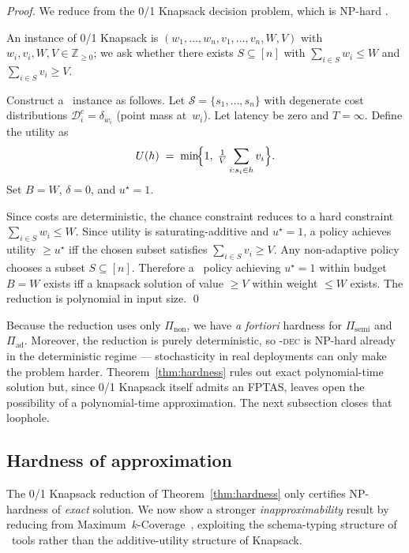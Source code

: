 \begin{proof}
We reduce from the 0/1 Knapsack decision problem, which is NP-hard
\cite{garey1979computers}.

An instance of 0/1 Knapsack is
$(w_1, \dots, w_n, v_1, \dots, v_n, W, V)$ with
$w_i, v_i, W, V \in \mathbb{Z}_{\ge 0}$; we ask whether there exists
$S \subseteq [n]$ with
$\sum_{i \in S} w_i \le W$ and $\sum_{i \in S} v_i \ge V$.

Construct a \CBSLAO~instance as follows. Let
$\mathcal{S} = \{s_1, \dots, s_n\}$ with degenerate cost distributions
$\mathcal{D}_i^c = \delta_{w_i}$ (point mass at~$w_i$). Let latency be
zero and $T = \infty$. Define the utility as
\[
  U(h) \;=\; \min\!\Bigl\{1,\; \tfrac{1}{V}\sum_{i : s_i \in h} v_i\Bigr\}.
\]
Set $B = W$, $\delta = 0$, and $u^\star = 1$.

Since costs are deterministic, the chance constraint reduces to a hard
constraint $\sum_{i \in S} w_i \le W$. Since utility is
saturating-additive and $u^\star = 1$, a policy achieves utility
$\ge u^\star$ iff the chosen subset satisfies
$\sum_{i \in S} v_i \ge V$. Any non-adaptive policy chooses a subset
$S \subseteq [n]$. Therefore a \CBSLAO~policy achieving $u^\star = 1$
within budget $B = W$ exists iff a knapsack solution of value $\ge V$
within weight $\le W$ exists. The reduction is polynomial in input
size.
\qed
\end{proof}

\begin{remark}
\label{rem:har}
Because the reduction uses only $\Pi_{\mathrm{non}}$, we have
\emph{a fortiori} hardness for $\Pi_{\mathrm{semi}}$ and
$\Pi_{\mathrm{ad}}$. Moreover, the reduction is purely
deterministic, so \CBSLAO-\textsc{dec} is NP-hard already in the
deterministic regime --- stochasticity in real deployments can only
make the problem harder. Theorem~\ref{thm:hardness} rules out exact
polynomial-time solution but, since 0/1 Knapsack itself admits an
FPTAS, leaves open the possibility of a polynomial-time approximation.
The next subsection closes that loophole.
\end{remark}

\subsection{Hardness of approximation}
\label{sec:inapprox}

The 0/1 Knapsack reduction of Theorem~\ref{thm:hardness} only certifies
NP-hardness of \emph{exact} solution. We now show a stronger
\emph{inapproximability} result by reducing from
Maximum~$k$-Coverage~\cite{feige1998threshold}, exploiting the
schema-typing structure of \CBSLAO~tools rather than the
additive-utility structure of Knapsack.

